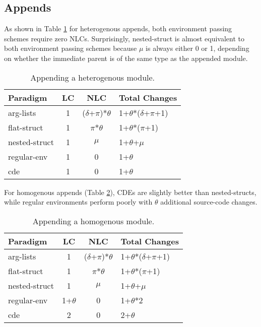 \subsection{Appends}

As shown in Table \ref{het:app} for heterogenous appends, both environment passing schemes require zero NLCs. Surprisingly, nested-struct is almost equivalent to both environment passing schemes because $\mu$ is always either 0 or 1, depending on whether the immediate parent is of the same type as the appended module.

\begin{table}
\centering
\begin{tabular*}{0.45\textwidth}{lccl}
\toprule
Paradigm    & LC & NLC & Total Changes\\
\midrule
arg-lists      &  1 & ($\delta$+$\pi$)*$\theta$ & 1+$\theta$*($\delta$+$\pi$+1)  \\
flat-struct  &  1 & $\pi$*$\theta$ &  1+$\theta$*($\pi$+1)  \\
nested-struct    &  1 & $\mu$ &  1+$\theta$+$\mu$  \\
regular-env    &  1 & 0 & 1+$\theta$ \\
cde &  1 & 0 & 1+$\theta$  \\
\bottomrule
\end{tabular*}
\caption{Appending a heterogenous module.}
\label{het:app}
\end{table}

For homogenous appends (Table \ref{hom:app}), CDEs are slightly better than nested-structs, while regular environments perform poorly with $\theta$ additional source-code changes.

\begin{table}
\centering
\begin{tabular*}{0.45\textwidth}{lccl}
\toprule
Paradigm    & LC & NLC &Total Changes\\
\midrule
arg-lists      &  1 & ($\delta$+$\pi$)*$\theta$ & 1+$\theta$*($\delta$+$\pi$+1)  \\
flat-struct  &  1 & $\pi$*$\theta$ & 1+$\theta$*($\pi$+1)  \\
nested-struct    &  1 & $\mu$ & 1+$\theta$+$\mu$  \\
regular-env    &  1+$\theta$ & 0 & 1+$\theta$*2 \\
cde &  2 & 0 & 2+$\theta$  \\
\bottomrule
\end{tabular*}
\caption{Appending a homogenous module.}
\label{hom:app}
\end{table}


